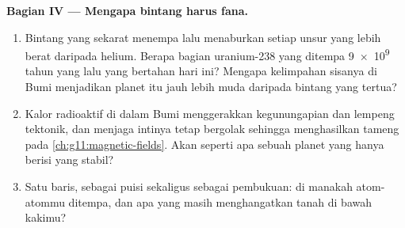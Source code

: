 \begin{problem}
\medskip
\noindent\textbf{Bagian IV --- Mengapa bintang harus fana.}
\begin{enumerate}[resume]
  \item Bintang yang sekarat menempa lalu menaburkan setiap unsur yang
        lebih berat daripada helium. Berapa bagian uranium-238 yang ditempa
        \num{9e9} tahun yang lalu yang bertahan hari ini? Mengapa kelimpahan
        sisanya di Bumi menjadikan planet itu jauh lebih muda daripada
        bintang yang tertua?
  \item Kalor radioaktif di dalam Bumi menggerakkan kegunungapian dan
        lempeng tektonik, dan menjaga intinya tetap bergolak sehingga
        menghasilkan tameng  pada
        \cref{ch:g11:magnetic-fields}. Akan seperti apa
        sebuah planet yang hanya berisi  yang stabil?
  \item Satu baris, sebagai puisi sekaligus sebagai pembukuan: di manakah
        atom-atommu ditempa, dan apa yang masih menghangatkan tanah di bawah
        kakimu?
\end{enumerate}
\end{problem}
